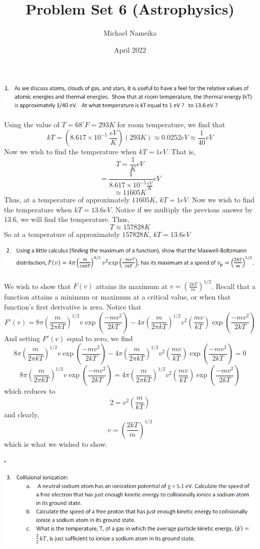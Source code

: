 \documentclass{article}
\title{Problem Set 6 (Astrophysics)}
\author{Michael Nameika}
\date{April 2022}
\begin{document}
\maketitle

\includegraphics[scale = 0.8]{probset6prob1.PNG}

Using the value of $T = 68^{\circ} F = 293 K$ for room temperature, we find that
\[kT = (8.617 \times 10^{-5} \: \frac{eV}{K})(293 K) \approx 0.0252 eV \approx \frac{1}{40}eV\]
Now we wish to find the temperature when $kT = 1 eV$. That is,
\[T = \frac{1}{K} eV\]
\[ = \frac{1}{8.617 \times 10^{-5} \frac{eV}{K}} eV\]
\[ \approx 11605 K\]
Thus, at a temperature of approximately $11605 K$, $kT = 1 eV$. Now we wish to find the temperature when $kT = 13.6 eV$. Notice if we multiply the previous answer by 13.6, we will find the temperature. Thus,
\[T \approx 157828 K \]
So at a temperature of approximately $157828 K$, $kT = 13.6 eV$
\newline



\includegraphics[scale = 0.8]{probset6prob2.PNG}
\newline

We wish to show that $F(v)$ attains its maximum at $v = (\frac{2kT}{m})^{1/2}$. 
Recall that a function attains a minimum or maximum at a critical value, or when that function's first derivative is zero. Notice that
\[F'(v) = 8\pi (\frac{m}{2\pi kT})^{1/2}v\exp{(\frac{-mv^2}{2kT})} - 4\pi(\frac{m}{2\pi kT})^{1/2}v^2(\frac{mv}{kT})\exp{(\frac{-mv^2}{2kT})}\]
And setting $F'(v)$ equal to zero, we find
\[8\pi (\frac{m}{2\pi kT})^{1/2}v\exp{(\frac{-mv^2}{2kT})} - 4\pi(\frac{m}{2\pi kT})^{1/2}v^2(\frac{mv}{kT})\exp{(\frac{-mv^2}{2kT})} = 0\]
\[8\pi (\frac{m}{2\pi kT})^{1/2}v\exp{(\frac{-mv^2}{2kT})} = 4\pi(\frac{m}{2\pi kT})^{1/2}v^2(\frac{mv}{kT})\exp{(\frac{-mv^2}{2kT})}\]
which reduces to
\[2 = v^2(\frac{m}{kT})\]
and clearly,
\[v = (\frac{2kT}{m})^{1/2}\]
which is what we wished to show.
\begin{flushright}
    $\square$
\end{flushright}

\includegraphics[scale = 0.8]{probset6prob3.PNG}
\newline
\end{document}
